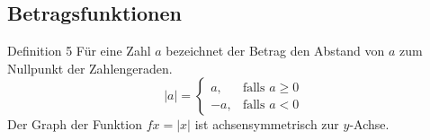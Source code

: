 	\subsection{Betragsfunktionen}
	\begin{minipage}{1\linewidth}
		\begin{definition}{Definition 5}
		Für eine Zahl $a$ bezeichnet der Betrag den Abstand von $a$ zum Nullpunkt der Zahlengeraden.
		\begin{equation*}
			|a| =
			\begin{cases}
				a, & \text{falls } a \geq 0 \\
				-a, & \text{falls } a < 0
			\end{cases}
		\end{equation*}
		Der Graph der Funktion $f{x}=|x|$ ist achsensymmetrisch zur $y$-Achse.

		\end{definition}
	\end{minipage}
